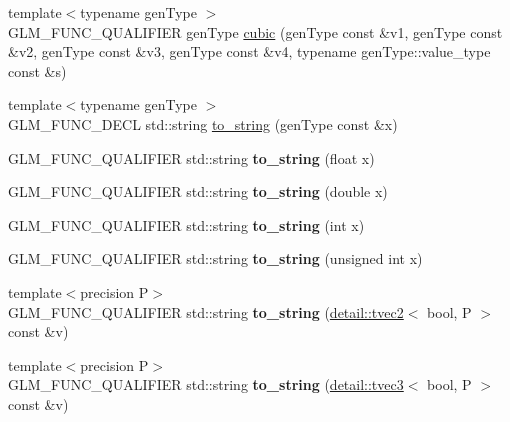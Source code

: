 \begin{DoxyCompactItemize}
\item 
{\footnotesize template$<$typename gen\-Type $>$ }\\G\-L\-M\-\_\-\-F\-U\-N\-C\-\_\-\-Q\-U\-A\-L\-I\-F\-I\-E\-R gen\-Type \hyperlink{group__gtx__spline_ga6b867eb52e2fc933d2e0bf26aabc9a70}{cubic} (gen\-Type const \&v1, gen\-Type const \&v2, gen\-Type const \&v3, gen\-Type const \&v4, typename gen\-Type\-::value\-\_\-type const \&s)
\item 
{\footnotesize template$<$typename gen\-Type $>$ }\\G\-L\-M\-\_\-\-F\-U\-N\-C\-\_\-\-D\-E\-C\-L std\-::string \hyperlink{group__gtx__string__cast_ga8f0dced1fd45e67e2d77e80ab93c7af5}{to\-\_\-string} (gen\-Type const \&x)
\item 
\hypertarget{namespaceglm_a7ce206c00733fcd6f17f2923de5009ae}{G\-L\-M\-\_\-\-F\-U\-N\-C\-\_\-\-Q\-U\-A\-L\-I\-F\-I\-E\-R std\-::string {\bfseries to\-\_\-string} (float x)}\label{namespaceglm_a7ce206c00733fcd6f17f2923de5009ae}

\item 
\hypertarget{namespaceglm_adda934ba3c94a727a59b850fbc7431d3}{G\-L\-M\-\_\-\-F\-U\-N\-C\-\_\-\-Q\-U\-A\-L\-I\-F\-I\-E\-R std\-::string {\bfseries to\-\_\-string} (double x)}\label{namespaceglm_adda934ba3c94a727a59b850fbc7431d3}

\item 
\hypertarget{namespaceglm_aaa0a03765f0abafa90fa4f605ce016b9}{G\-L\-M\-\_\-\-F\-U\-N\-C\-\_\-\-Q\-U\-A\-L\-I\-F\-I\-E\-R std\-::string {\bfseries to\-\_\-string} (int x)}\label{namespaceglm_aaa0a03765f0abafa90fa4f605ce016b9}

\item 
\hypertarget{namespaceglm_aedf5aff2c68a8c282820904ba2396625}{G\-L\-M\-\_\-\-F\-U\-N\-C\-\_\-\-Q\-U\-A\-L\-I\-F\-I\-E\-R std\-::string {\bfseries to\-\_\-string} (unsigned int x)}\label{namespaceglm_aedf5aff2c68a8c282820904ba2396625}

\item 
\hypertarget{namespaceglm_a68ac143fd7a22236f078e45cf8788cbe}{{\footnotesize template$<$precision P$>$ }\\G\-L\-M\-\_\-\-F\-U\-N\-C\-\_\-\-Q\-U\-A\-L\-I\-F\-I\-E\-R std\-::string {\bfseries to\-\_\-string} (\hyperlink{structglm_1_1detail_1_1tvec2}{detail\-::tvec2}$<$ bool, P $>$ const \&v)}\label{namespaceglm_a68ac143fd7a22236f078e45cf8788cbe}

\item 
\hypertarget{namespaceglm_afb3ab72a854a2aae00b8fd819f4b6dd1}{{\footnotesize template$<$precision P$>$ }\\G\-L\-M\-\_\-\-F\-U\-N\-C\-\_\-\-Q\-U\-A\-L\-I\-F\-I\-E\-R std\-::string {\bfseries to\-\_\-string} (\hyperlink{structglm_1_1detail_1_1tvec3}{detail\-::tvec3}$<$ bool, P $>$ const \&v)}\label{namespaceglm_afb3ab72a854a2aae00b8fd819f4b6dd1}


\end{DoxyCompactItemize}
